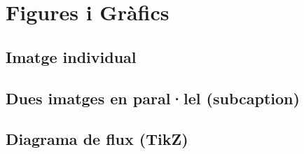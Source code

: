 \documentclass[informe, catalan]{practicaitic}
\theoremstyle{definition}
\theoremstyle{remark}
\begin{document}
\section{Figures i Gràfics}

\subsection{Imatge individual}


\subsection{Dues imatges en paral·lel (subcaption)}


\subsection{Diagrama de flux (TikZ)}
\end{document}
